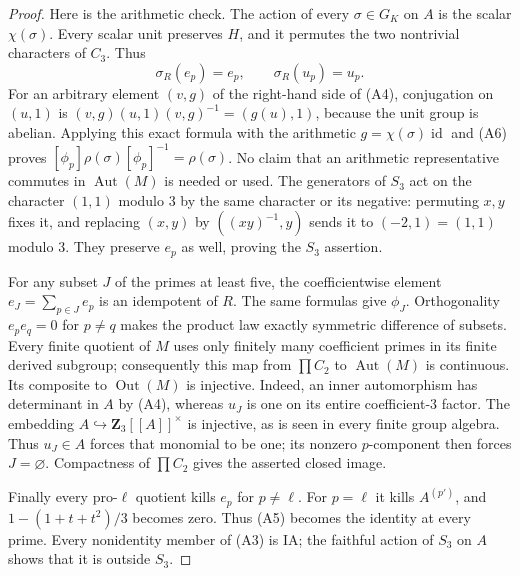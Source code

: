 \documentclass[11pt,oneside]{article}
\begin{document}
\begin{proof}
Here is the arithmetic check.  The action of every
$\sigma\in G_K$ on $A$ is the scalar $\chi(\sigma)$.
Every scalar unit preserves $H$, and it permutes the two
nontrivial characters of $C_3$.  Thus
\[
      \sigma_R(e_p)=e_p,
      \qquad \sigma_R(u_p)=u_p.                            \tag{A6}
\]
For an arbitrary element $(v,g)$ of the right-hand side of
(A4), conjugation on $(u,1)$ is
$(v,g)(u,1)(v,g)^{-1}=(g(u),1)$, because the unit group
is abelian.  Applying this exact formula with the
arithmetic $g=\chi(\sigma)\operatorname{id}$ and (A6)
proves $[\phi_p]\rho(\sigma)[\phi_p]^{-1}=\rho(\sigma)$.
No claim that an arithmetic representative commutes in
$\operatorname{Aut}(M)$ is needed or used.
The generators of $S_3$ act on the character $(1,1)$
modulo $3$ by the same character or its negative:
permuting $x,y$ fixes it, and replacing $(x,y)$ by
$((xy)^{-1},y)$ sends it to $(-2,1)=(1,1)$ modulo $3$.
They preserve $e_p$ as well, proving the $S_3$ assertion.

For any subset $J$ of the primes at least five, the
coefficientwise element $e_J=\sum_{p\in J}e_p$ is an
idempotent of $R$.  The same formulas give $\phi_J$.
Orthogonality $e_pe_q=0$ for $p\ne q$ makes the product
law exactly symmetric difference of subsets.  Every
finite quotient of $M$ uses only finitely many coefficient
primes in its finite derived subgroup; consequently this
map from $\prod C_2$ to $\operatorname{Aut}(M)$ is
continuous.  Its composite to $\operatorname{Out}(M)$ is
injective.  Indeed, an inner automorphism has determinant
in $A$ by (A4), whereas $u_J$ is one on its entire
coefficient-$3$ factor.  The embedding
$A\hookrightarrow\mathbf Z_3[[A]]^\times$ is injective,
as is seen in every finite group algebra.  Thus
$u_J\in A$ forces that monomial to be one; its nonzero
$p$-component then forces $J=\varnothing$.
Compactness of $\prod C_2$ gives the asserted closed image.

Finally every pro-$\ell$ quotient kills $e_p$ for
$p\ne\ell$.  For $p=\ell$ it kills $A^{(p')}$, and
$1-(1+t+t^2)/3$ becomes zero.  Thus (A5) becomes the
identity at every prime.  Every nonidentity member of
(A3) is IA; the faithful action of $S_3$ on $A$ shows
that it is outside $S_3$.
\end{proof}
\end{document}
